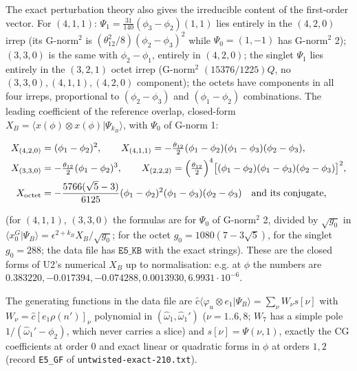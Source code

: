 \documentclass[11pt]{article}
\begin{document}
The exact perturbation theory also gives the irreducible content of the first-order vector.
For $(4,1,1)$: $\Psi_1=\tfrac{31}{140}(\phi_3-\phi_2)(1,1)$ lies entirely in the $(4,2,0)$ irrep (its G-norm$^2$ is $(\theta_{12}^2/8)(\phi_2-\phi_3)^2$ while $\Psi_0=(1,-1)$ has G-norm$^2$ 2); $(3,3,0)$ is the same with $\phi_2-\phi_1$, entirely in $(4,2,0)$; the singlet $\Psi_1$ lies entirely in the $(3,2,1)$ octet irrep (G-norm$^2$ $(15376/1225)Q$, no $(3,3,0),(4,1,1),(4,2,0)$ component); the octets have components in all four irreps, proportional to $(\phi_2-\phi_3)$ and $(\phi_1-\phi_2)$ combinations.
The leading coefficient of the reference overlap, closed-form $X_B=\langle x(\phi)\otimes x(\phi)|\Psi_{k_B}\rangle$, with $\Psi_0$ of G-norm 1:

\begin{equation}
\begin{aligned}
X_{(4,2,0)}&=(\phi_1-\phi_2)^2,\qquad X_{(4,1,1)}=-\tfrac{\theta_{12}}2(\phi_1-\phi_2)(\phi_1-\phi_3)(\phi_2-\phi_3),\\
X_{(3,3,0)}&=-\tfrac{\theta_{12}}2(\phi_1-\phi_2)^3,\qquad X_{(2,2,2)}=\Bigl(\tfrac{\theta_{12}}2\Bigr)^4\bigl[(\phi_1-\phi_2)(\phi_1-\phi_3)(\phi_2-\phi_3)\bigr]^2,\\
X_{\rm octet}&=-\frac{5766(\sqrt5-3)}{6125}(\phi_1-\phi_2)^2(\phi_1-\phi_3)(\phi_2-\phi_3)\quad\text{and its conjugate,}
\end{aligned}\label{eq:XBforms}
\end{equation}

(for $(4,1,1)$, $(3,3,0)$ the formulas are for $\Psi_0$ of G-norm$^2$ 2, divided by $\sqrt{g_0}$ in $\langle x_0^G|\Psi_B\rangle=\epsilon^{2+k_B}X_B/\sqrt{g_0}$; for the octet $g_0=1080(7-3\sqrt5)$, for the singlet $g_0=288$; the data file has $\texttt{E5\_KB}$ with the exact strings).
These are the closed forms of U2's numerical $X_B$ up to normalisation: e.g. at $\phi$ the numbers are $0.383220,-0.017394,-0.074288,0.0013930,6.9931\cdot10^{-6}$.

The generating functions in the data file are $\hat c\langle\varphi_u\otimes e_1|\Psi_B\rangle=\sum_\nu W_\nu s[\nu]$ with $W_\nu=\hat c[e_1\rho(n')]_\nu$ polynomial in $(\hat\omega_1,\hat\omega_1')$ ($\nu=1..6,8$; $W_7$ has a simple pole $1/(\hat\omega_1'-\phi_2)$, which never carries a slice) and $s[\nu]=\Psi(\nu,1)$, exactly the CG coefficients at order $0$ and exact linear or quadratic forms in $\phi$ at orders $1,2$ (record \texttt{E5\_\allowbreak{}GF} of \texttt{untwisted-\allowbreak{}exact-\allowbreak{}210.\allowbreak{}txt}).
\end{document}
